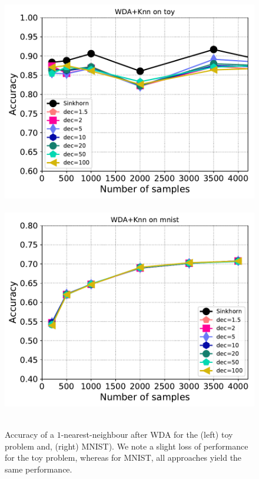 \begin{figure}[htbp]
	\centering
	~\hfill~\includegraphics[width=6.cm]{./figs/wda_accur_toy.pdf}~\hfill~
	\includegraphics[width=6.cm]{./figs/wda_accur_mnist.pdf}~\hfill~\\
	\caption{Accuracy of a $1$-nearest-neighbour after WDA for the (left) toy problem and, (right) MNIST). We note a slight loss of performance for the toy problem, whereas for MNIST, all approaches yield the same performance. 
		\label{fig:wda_gain}}
\end{figure}


